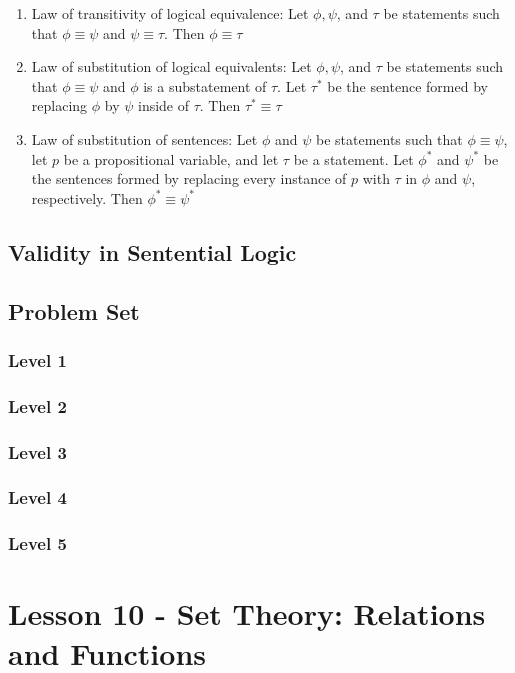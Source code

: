 \documentclass{article}
\begin{document}
\begin{proposition}
    \begin{enumerate}
	\item Law of transitivity of logical equivalence: Let $\phi, \psi$,
	    and $\tau$ be statements such that $\phi \equiv \psi$ and
	    $\psi \equiv \tau$. Then $\phi \equiv \tau$
	\item Law of substitution of logical equivalents: Let $\phi, \psi$, and $\tau$ be statements such that $\phi \equiv \psi$ and $\phi$ is a substatement of $\tau$. Let $\tau^{*}$ be the sentence formed by replacing $\phi$ by $\psi$ inside of $\tau$. Then $\tau^{*} \equiv \tau$
	\item Law of substitution of sentences: Let $\phi$ and $\psi$ be statements such that $\phi \equiv \psi$, let $p$ be a propositional variable, and let $\tau$ be a statement. Let $\phi^{*}$ and $\psi^{*}$ be the sentences formed by replacing every instance of $p$ with $\tau$ in $\phi$ and $\psi$, respectively. Then $\phi^{*} \equiv \psi^{*}$
    \end{enumerate}
\end{proposition}

\subsection{Validity in Sentential Logic}
\subsection{Problem Set}
\subsubsection{Level 1}
\subsubsection{Level 2}
\subsubsection{Level 3}
\subsubsection{Level 4}
\subsubsection{Level 5}
\pagebreak

\section{Lesson 10 - Set Theory: Relations and Functions}
\end{document}
